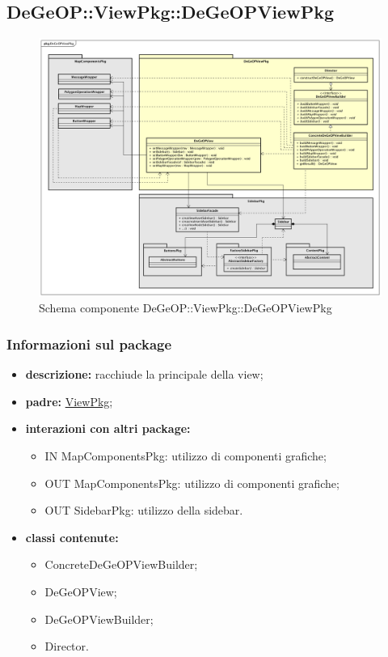 \subsection{DeGeOP::ViewPkg::DeGeOPViewPkg}
\label{pkg::DeGeOPViewPkg}
\begin{figure}[H]
	\centering
	\includegraphics[width=\textwidth]{img/PkgDiagram/DeGeOPViewPkg.png}
	\caption{Schema componente DeGeOP::ViewPkg::DeGeOPViewPkg}
\end{figure}
\subsubsection{Informazioni sul package}
\begin{itemize}
	\item \textbf{descrizione:} racchiude la  principale della view;
	\item \textbf{padre:} \hyperref[pkg::ViewPkg]{ViewPkg};
	\item \textbf{interazioni con altri package:} 
	\begin{itemize}
		\item IN MapComponentsPkg: utilizzo di componenti grafiche;
		\item OUT MapComponentsPkg: utilizzo di componenti grafiche;
		\item OUT SidebarPkg: utilizzo della sidebar.
	\end{itemize}
	\item \textbf{classi contenute:}
	\begin{itemize}
		\item ConcreteDeGeOPViewBuilder;
		\item DeGeOPView;
		\item DeGeOPViewBuilder;
		\item Director.
	\end{itemize}
\end{itemize}
